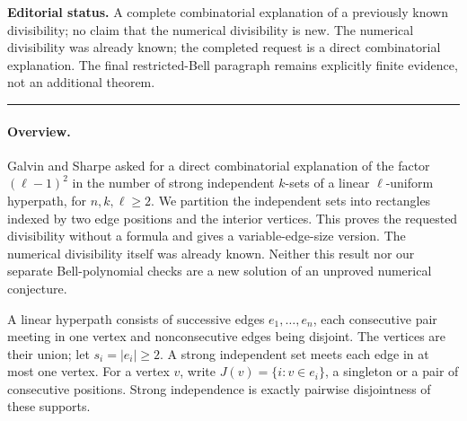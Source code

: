 \documentclass[11pt,a4paper]{article}
\begin{document}
\noindent\textbf{Editorial status.} A complete combinatorial explanation of a previously known divisibility; no claim that the numerical divisibility is new. The numerical divisibility was already known; the completed request is a direct combinatorial explanation. The final restricted-Bell paragraph remains explicitly finite evidence, not an additional theorem.

\smallskip\hrule\medskip



\begingroup

\setcounter{equation}{0}
\renewcommand{\theequation}{\thesection.\arabic{equation}}
\renewcommand{\theHequation}{R24T.\arabic{equation}}
\paragraph{Overview.}
Galvin and Sharpe asked for a direct combinatorial explanation of the
factor $(\ell-1)^2$ in the number of strong independent $k$-sets of a
linear $\ell$-uniform hyperpath, for $n,k,\ell\ge2$. We partition the
independent sets into rectangles indexed by two edge positions and
the interior vertices. This proves the requested divisibility without
a formula and gives a variable-edge-size version. The numerical
divisibility itself was already known. Neither this result nor our
separate Bell-polynomial checks are a new solution of an unproved
numerical conjecture.


A linear hyperpath consists of successive edges $e_1,\ldots,e_n$,
each consecutive pair meeting in one vertex and nonconsecutive edges
being disjoint. The vertices are their union; let $s_i=|e_i|\ge2$.
A strong independent set meets each edge in at most one vertex.
For a vertex $v$, write $J(v)=\{i:v\in e_i\}$, a singleton or a
pair of consecutive positions. Strong independence is exactly
pairwise disjointness of these supports.
\end{document}
